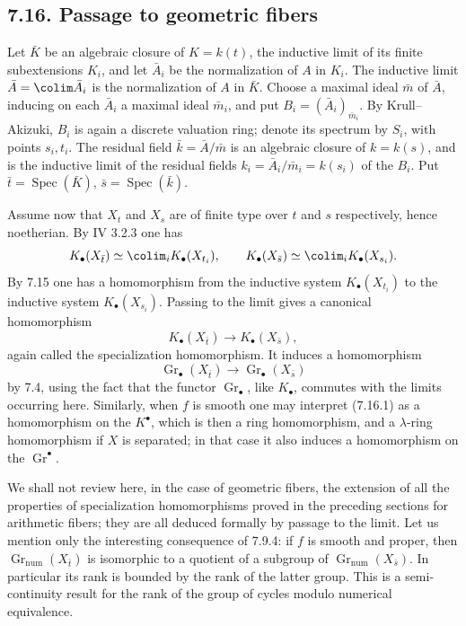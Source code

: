 \documentclass[11pt]{article}
\newcommand{\Gr}{\operatorname{Gr}}
\newcommand{\Spec}{\operatorname{Spec}}
\providecommand{\Gr}{\operatorname{Gr}}
\providecommand{\Gr}{\operatorname{G}}
\begin{document}
\subsection*{7.16. Passage to geometric fibers}
Let \(\bar K\) be an algebraic closure of \(K=k(t)\), the inductive limit of its finite subextensions \(K_i\), and let \(\bar A_i\) be the normalization of \(A\) in \(K_i\). The inductive limit \(\bar A=\colim \bar A_i\) is the normalization of \(A\) in \(\bar K\). Choose a maximal ideal \(\bar m\) of \(\bar A\), inducing on each \(\bar A_i\) a maximal ideal \(\bar m_i\), and put \(B_i=(\bar A_i)_{\bar m_i}\). By Krull--Akizuki, \(B_i\) is again a discrete valuation ring; denote its spectrum by \(S_i\), with points \(s_i,t_i\). The residual field \(\bar k=\bar A/\bar m\) is an algebraic closure of \(k=k(s)\), and is the inductive limit of the residual fields \(k_i=\bar A_i/\bar m_i=k(s_i)\) of the \(B_i\). Put \(\bar t=\Spec(\bar K)\), \(\bar s=\Spec(\bar k)\).

Assume now that \(X_t\) and \(X_s\) are of finite type over \(t\) and \(s\) respectively, hence noetherian. By IV 3.2.3 one has
\[
  K_\bullet(X_{\bar t})\simeq \colim_i K_\bullet(X_{t_i}),
  \qquad
  K_\bullet(X_{\bar s})\simeq \colim_i K_\bullet(X_{s_i}).
\]
By 7.15 one has a homomorphism from the inductive system \(K_\bullet(X_{t_i})\) to the inductive system \(K_\bullet(X_{s_i})\). Passing to the limit gives a canonical homomorphism
\begin{equation}\tag{7.16.1}
  K_\bullet(X_{\bar t})\longrightarrow K_\bullet(X_{\bar s}),
\end{equation}
again called the specialization homomorphism. It induces a homomorphism
\[
  \Gr_\bullet(X_{\bar t})\longrightarrow\Gr_\bullet(X_{\bar s})
\]
by 7.4, using the fact that the functor \(\Gr_\bullet\), like \(K_\bullet\), commutes with the limits occurring here. Similarly, when \(f\) is smooth one may interpret (7.16.1) as a homomorphism on the \(K^\bullet\), which is then a ring homomorphism, and a \(\lambda\)-ring homomorphism if \(X\) is separated; in that case it also induces a homomorphism on the \(\Gr^\bullet\).

We shall not review here, in the case of geometric fibers, the extension of all the properties of specialization homomorphisms proved in the preceding sections for arithmetic fibers; they are all deduced formally by passage to the limit. Let us mention only the interesting consequence of 7.9.4: if \(f\) is smooth and proper, then \(\Gr_{\mathrm{num}}(X_{\bar t})\) is isomorphic to a quotient of a subgroup of \(\Gr_{\mathrm{num}}(X_{\bar s})\). In particular its rank is bounded by the rank of the latter group. This is a semi-continuity result for the rank of the group of cycles modulo numerical equivalence.
\end{document}
